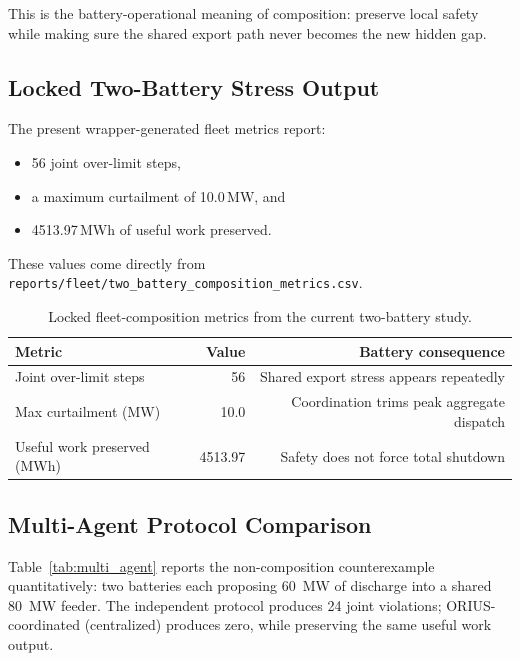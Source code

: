 This is the battery-operational meaning of composition: preserve local safety
while making sure the shared export path never becomes the new hidden gap.

\subsection{Locked Two-Battery Stress Output}

The present wrapper-generated fleet metrics report:

\begin{itemize}
  \item 56 joint over-limit steps,
  \item a maximum curtailment of 10.0\,MW, and
  \item 4513.97\,MWh of useful work preserved.
\end{itemize}

These values come directly from
\texttt{reports/fleet/two\_battery\_composition\_metrics.csv}.

\begin{table}[ht]
\centering
\caption{Locked fleet-composition metrics from the current two-battery study.}
\label{tab:fleet-results}
\begin{tabular}{lrr}
\toprule
\textbf{Metric} & \textbf{Value} & \textbf{Battery consequence} \\
\midrule
Joint over-limit steps & 56 & Shared export stress appears repeatedly \\
Max curtailment (MW) & 10.0 & Coordination trims peak aggregate dispatch \\
Useful work preserved (MWh) & 4513.97 & Safety does not force total shutdown \\
\bottomrule
\end{tabular}
\end{table}

\subsection{Multi-Agent Protocol Comparison}

Table~\ref{tab:multi_agent} reports the non-composition counterexample
quantitatively: two batteries each proposing 60~MW of discharge into a
shared 80~MW feeder.  The independent protocol produces 24 joint
violations; ORIUS-coordinated (centralized) produces zero, while
preserving the same useful work output.


